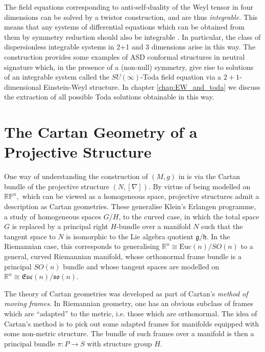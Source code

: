 The field equations corresponding to anti-self-duality of the Weyl
tensor in four dimensions can be solved by a twistor construction,
and are thus \textit{integrable.} This means that any systems of differential
equations which can be obtained from them by symmetry reduction should
also be integrable \cite{Tod1995}. In particular, the class of dispersionless
integrable systems in 2+1 and 3 dimensions arise in this way. The
construction \cite{DM} provides some examples of
ASD conformal structures in neutral signature which, in the presence
of a (non-null) symmetry, give rise to solutions of an integrable
system called the $SU(\infty)$-Toda field equation via a $2+1$-dimensional
Einstein-Weyl structure. In chapter \ref{chap:EW_and_toda} we discuss the extraction
of all possible Toda solutions obtainable in this way.






\section{The Cartan Geometry of a Projective Structure}

One way of understanding the construction of $(M,g)$ in \cite{DM}
is via the Cartan bundle of the projective structure $(N,[\nabla])$.
By virtue of being modelled on $\mathbb{RP}^{n},$ which can be viewed
as a homogeneous space, projective structures admit a description
as Cartan geometries. These generalise Klein's Erlangen programme,
a study of homogeneous spaces $G/H$, to the curved case, in which
the total space $G$ is replaced by a principal right $H$-bundle
over a manifold $N$ such that the tangent space to $N$ is isomorphic
to the Lie algebra quotient $\mathfrak{g}/\mathfrak{h}$. In the Riemannian
case, this corresponds to generalising $\mathbb{R}^{n}\cong\mathrm{Euc}(n)/SO(n)$
to a general, curved Riemannian manifold, whose orthonormal frame
bundle is a principal $SO(n)$ bundle and whose tangent spaces are
modelled on $\mathbb{R}^{n}\cong\mathfrak{Euc}(n)/\mathfrak{so}(n)$.

The theory of Cartan geometries was developed as part of Cartan's
\textit{method of moving frames}. In Riemannian geometry, one has
an obvious subclass of frames which are ``adapted'' to the metric,
i.e. those which are orthonormal. The idea of Cartan's method is to
pick out some adapted frames for manifolds equipped with some non-metric
structure. The bundle of such frames over a manifold is then a principal
bundle $\pi:P\rightarrow S$ with structure group $H$.


